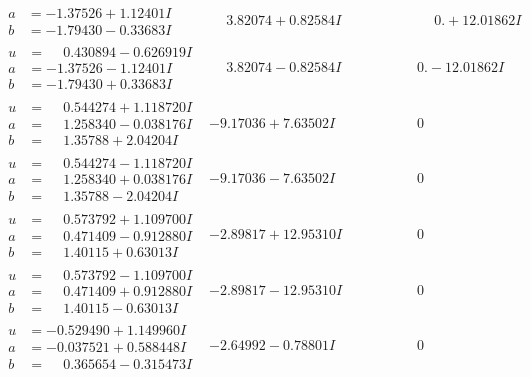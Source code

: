 \documentclass[1p]{elsarticle_modified}
\theoremstyle{definition}
\begin{document}
$$\begin{array}{c|c|c}
\begin{aligned}
a &= -1.37526 + 1.12401 I \\
b &= -1.79430 - 0.33683 I\end{aligned}
 & \phantom{-}3.82074 + 0.82584 I & \phantom{-0.000000 -}0. + 12.01862 I \\ \hline\begin{aligned}
u &= \phantom{-}0.430894 - 0.626919 I \\
a &= -1.37526 - 1.12401 I \\
b &= -1.79430 + 0.33683 I\end{aligned}
 & \phantom{-}3.82074 - 0.82584 I & \phantom{-0.000000 } 0. - 12.01862 I \\ \hline\begin{aligned}
u &= \phantom{-}0.544274 + 1.118720 I \\
a &= \phantom{-}1.258340 - 0.038176 I \\
b &= \phantom{-}1.35788 + 2.04204 I\end{aligned}
 & -9.17036 + 7.63502 I & \phantom{-0.000000 } 0 \\ \hline\begin{aligned}
u &= \phantom{-}0.544274 - 1.118720 I \\
a &= \phantom{-}1.258340 + 0.038176 I \\
b &= \phantom{-}1.35788 - 2.04204 I\end{aligned}
 & -9.17036 - 7.63502 I & \phantom{-0.000000 } 0 \\ \hline\begin{aligned}
u &= \phantom{-}0.573792 + 1.109700 I \\
a &= \phantom{-}0.471409 - 0.912880 I \\
b &= \phantom{-}1.40115 + 0.63013 I\end{aligned}
 & -2.89817 + 12.95310 I & \phantom{-0.000000 } 0 \\ \hline\begin{aligned}
u &= \phantom{-}0.573792 - 1.109700 I \\
a &= \phantom{-}0.471409 + 0.912880 I \\
b &= \phantom{-}1.40115 - 0.63013 I\end{aligned}
 & -2.89817 - 12.95310 I & \phantom{-0.000000 } 0 \\ \hline\begin{aligned}
u &= -0.529490 + 1.149960 I \\
a &= -0.037521 + 0.588448 I \\
b &= \phantom{-}0.365654 - 0.315473 I\end{aligned}
 & -2.64992 - 0.78801 I & \phantom{-0.000000 } 0 \\ \hline\begin{aligned}

\end{aligned}
\end{array}$$
\end{document}
